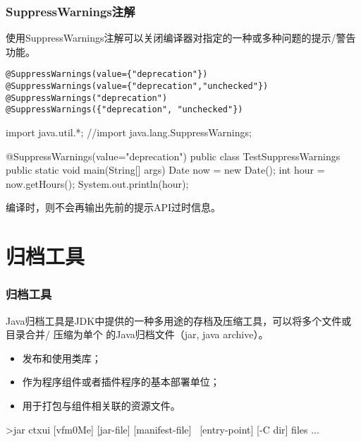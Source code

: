\begin{frame}[fragile] %
  \frametitle{SuppressWarnings注解}

  使用SuppressWarnings注解可以关闭编译器对指定的一种或多种问题的提示/警告功能。


\begin{verbatim}
@SuppressWarnings(value={"deprecation"})
@SuppressWarnings(value={"deprecation","unchecked"}) 
@SuppressWarnings("deprecation") 
@SuppressWarnings({"deprecation", "unchecked"})
\end{verbatim}

  \begin{javaCode}
    import java.util.*;
    //import java.lang.SuppressWarnings; 

    @SuppressWarnings(value={"deprecation"}) 
    public class TestSuppressWarnings {
      public static void main(String[] args) {
        Date now = new Date();
        int hour = now.getHours(); 
        System.out.println(hour);
      } 
    }  
  \end{javaCode}

  编译时，则不会再输出先前的提示API过时信息。
\end{frame}

\section{归档工具}

\begin{frame}[fragile] %
  \frametitle{归档工具}

  Java归档工具是JDK中提供的一种多用途的存档及压缩工具，可以将多个文件或目录合并/ 压缩为单个
  的Java归档文件（jar, java archive）。

  \begin{itemize}
  \item 发布和使用类库；
  \item 作为程序组件或者插件程序的基本部署单位；
  \item 用于打包与组件相关联的资源文件。
  \end{itemize}


  \begin{shCode}
    >jar {ctxui} [vfm0Me] [jar-file] [manifest-file] \  
    [entry-point] [-C dir] files ...
  \end{shCode}
\end{frame}

